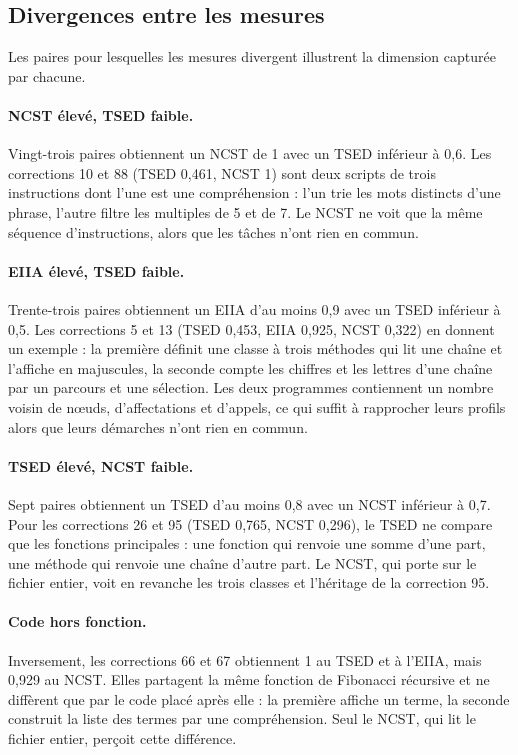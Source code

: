\documentclass[12pt,a4paper,oneside]{report}
\begin{document}
\subsection{Divergences entre les mesures}

Les paires pour lesquelles les mesures divergent illustrent la dimension
capturée par chacune.

\paragraph{NCST élevé, TSED faible.}
Vingt-trois paires obtiennent un NCST de 1 avec un TSED inférieur à 0,6. Les
corrections 10 et 88 (TSED 0,461, NCST 1) sont deux scripts de trois
instructions dont l'une est une compréhension : l'un trie les mots distincts
d'une phrase, l'autre filtre les multiples de 5 et de 7. Le NCST ne voit que
la même séquence d'instructions, alors que les tâches n'ont rien en commun.

\paragraph{EIIA élevé, TSED faible.}
Trente-trois paires obtiennent un EIIA d'au moins 0,9 avec un TSED inférieur à
0,5. Les corrections 5 et 13 (TSED 0,453, EIIA 0,925, NCST 0,322) en
donnent un exemple : la première définit une classe à trois méthodes qui lit
une chaîne et l'affiche en majuscules, la seconde compte les chiffres et les
lettres d'une chaîne par un parcours et une sélection. Les deux programmes
contiennent un nombre voisin de nœuds, d'affectations et d'appels, ce qui
suffit à rapprocher leurs profils alors que leurs démarches n'ont rien en
commun.

\paragraph{TSED élevé, NCST faible.}
Sept paires obtiennent un TSED d'au moins 0,8 avec un NCST inférieur à 0,7.
Pour les corrections 26 et 95 (TSED 0,765, NCST 0,296), le TSED ne compare
que les fonctions principales : une fonction qui renvoie une somme d'une
part, une méthode qui renvoie une chaîne d'autre part. Le NCST, qui porte
sur le fichier entier, voit en revanche les trois classes et l'héritage de
la correction 95.

\paragraph{Code hors fonction.}
Inversement, les corrections 66 et 67 obtiennent 1 au TSED et à l'EIIA, mais
0,929 au NCST. Elles partagent la même fonction de Fibonacci récursive et ne
diffèrent que par le code placé après elle : la première affiche un terme, la
seconde construit la liste des termes par une compréhension. Seul le NCST, qui
lit le fichier entier, perçoit cette différence.
\end{document}
